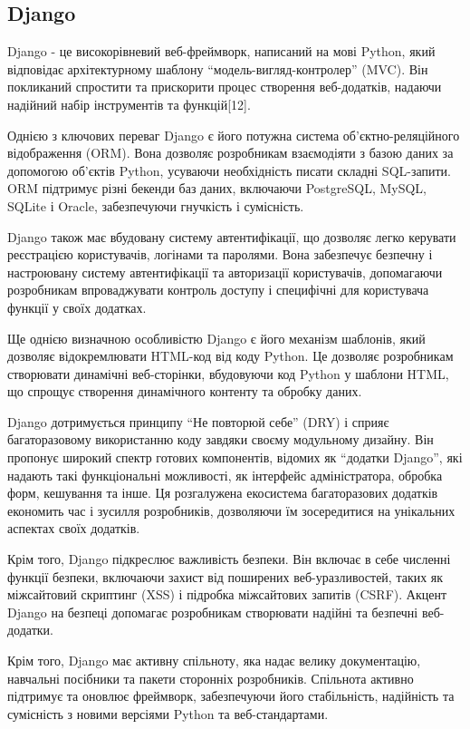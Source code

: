 \subsection{Django}
\label{subsec:django-subsection}

Django - це високорівневий веб-фреймворк, написаний на мові Python, який відповідає архітектурному шаблону ``модель-вигляд-контролер'' (MVC). Він покликаний спростити та прискорити процес створення веб-додатків, надаючи надійний набір інструментів та функцій[12].

Однією з ключових переваг Django є його потужна система об'єктно-реляційного відображення (ORM). Вона дозволяє розробникам взаємодіяти з базою даних за допомогою об'єктів Python, усуваючи необхідність писати складні SQL-запити. ORM підтримує різні бекенди баз даних, включаючи PostgreSQL, MySQL, SQLite і Oracle, забезпечуючи гнучкість і сумісність.

Django також має вбудовану систему автентифікації, що дозволяє легко керувати реєстрацією користувачів, логінами та паролями. Вона забезпечує безпечну і настроювану систему автентифікації та авторизації користувачів, допомагаючи розробникам впроваджувати контроль доступу і специфічні для користувача функції у своїх додатках.

Ще однією визначною особливістю Django є його механізм шаблонів, який дозволяє відокремлювати HTML-код від коду Python. Це дозволяє розробникам створювати динамічні веб-сторінки, вбудовуючи код Python у шаблони HTML, що спрощує створення динамічного контенту та обробку даних.

Django дотримується принципу ``Не повторюй себе'' (DRY) і сприяє багаторазовому використанню коду завдяки своєму модульному дизайну. Він пропонує широкий спектр готових компонентів, відомих як ``додатки Django'', які надають такі функціональні можливості, як інтерфейс адміністратора, обробка форм, кешування та інше. Ця розгалужена екосистема багаторазових додатків економить час і зусилля розробників, дозволяючи їм зосередитися на унікальних аспектах своїх додатків.

Крім того, Django підкреслює важливість безпеки. Він включає в себе численні функції безпеки, включаючи захист від поширених веб-уразливостей, таких як міжсайтовий скриптинг (XSS) і підробка міжсайтових запитів (CSRF). Акцент Django на безпеці допомагає розробникам створювати надійні та безпечні веб-додатки.

Крім того, Django має активну спільноту, яка надає велику документацію, навчальні посібники та пакети сторонніх розробників. Спільнота активно підтримує та оновлює фреймворк, забезпечуючи його стабільність, надійність та сумісність з новими версіями Python та веб-стандартами.

